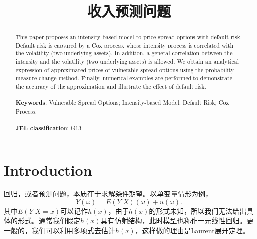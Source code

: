 \documentclass{article}
\begin{document}
\title{收入预测问题} 
\date{}
\maketitle
\begin{abstract}
	This paper proposes an intensity-based model to price spread options with default risk. Default risk is captured by a Cox process, whose intensity process is correlated with the volatility (two underlying assets). In addition, a general correlation between the intensity and  the volatility (two underlying assets) is allowed. We obtain an analytical expression of approximated prices of vulnerable spread options using the probability measure-change method. Finally, numerical examples are performed to demonstrate the accuracy of the approximation and illustrate the effect of  default risk.\\ \ \\
	{\bf Keywords}: Vulnerable Spread Options; Intensity-based Model; Default Risk; Cox Process.\\ \\
	{\bf JEL classification}: G13
	
	
\end{abstract}

\newpage
\section{Introduction}
回归，或者预测问题，本质在于求解条件期望。以单变量情形为例，
$$
Y(\omega) = E(Y|X)(\omega) + u(\omega).
$$
其中$E(Y|X=x)$可以记作$h(x)$，由于$h(x)$的形式未知，所以我们无法给出具体的形式。通常我们假定$h(x)$具有仿射结构，此时模型也称作一元线性回归。更一般的，我们可以利用多项式去估计$h(x)$，这样做的理由是Laurent展开定理。
\end{document}
